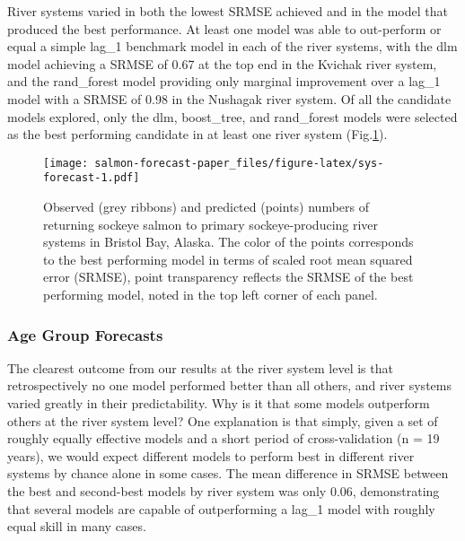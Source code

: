 \documentclass[
]{article}
\begin{document}
River systems varied in both the lowest SRMSE achieved and in the model that produced the best performance. At least one model was able to out-perform or equal a simple lag\_1 benchmark model in each of the river systems, with the dlm model achieving a SRMSE of 0.67 at the top end in the Kvichak river system, and the rand\_forest model providing only marginal improvement over a lag\_1 model with a SRMSE of 0.98 in the Nushagak river system. Of all the candidate models explored, only the dlm, boost\_tree, and rand\_forest models were selected as the best performing candidate in at least one river system (Fig.\ref{fig:sys-forecast}).

\begin{figure}
\centering
\texttt{[image: salmon-forecast-paper\_files/figure-latex/sys-forecast-1.pdf]}
\caption{\label{fig:sys-forecast}Observed (grey ribbons) and predicted (points) numbers of returning sockeye salmon to primary sockeye-producing river systems in Bristol Bay, Alaska. The color of the points corresponds to the best performing model in terms of scaled root mean squared error (SRMSE), point transparency reflects the SRMSE of the best performing model, noted in the top left corner of each panel.}
\end{figure}

\hypertarget{age-group-forecasts}{%
\subsubsection*{Age Group Forecasts}\label{age-group-forecasts}}

The clearest outcome from our results at the river system level is that retrospectively no one model performed better than all others, and river systems varied greatly in their predictability. Why is it that some models outperform others at the river system level? One explanation is that simply, given a set of roughly equally effective models and a short period of cross-validation (n = 19 years), we would expect different models to perform best in different river systems by chance alone in some cases. The mean difference in SRMSE between the best and second-best models by river system was only 0.06, demonstrating that several models are capable of outperforming a lag\_1 model with roughly equal skill in many cases.
\end{document}

